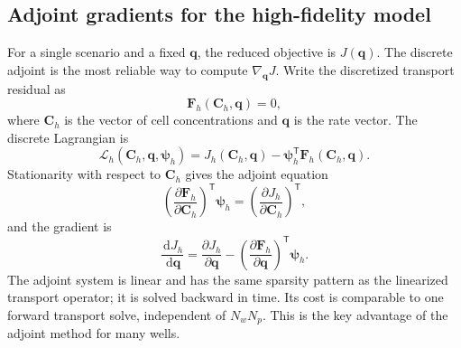 \documentclass[11pt]{article}
\numberwithin{equation}{section}
\newcommand{\dd}{\,\mathrm{d}}
\newcommand{\T}{\mathsf{T}}
\theoremstyle{plain}
\begin{document}
\subsection{Adjoint gradients for the high-fidelity model}
\label{sec:adjoint}

For a single scenario and a fixed $\mathbf{q}$, the reduced objective is
$J(\mathbf{q})$.  The discrete adjoint is the most reliable way to compute
$\nabla_{\mathbf{q}}J$.  Write the discretized transport residual as
\begin{equation}
\label{eq:discreteF}
\mathbf{F}_h(\mathbf{C}_h,\mathbf{q})=0,
\end{equation}
where $\mathbf{C}_h$ is the vector of cell concentrations and $\mathbf{q}$ is
the rate vector.  The discrete Lagrangian is
\begin{equation}
\label{eq:discreteL}
\mathcal{L}_h(\mathbf{C}_h,\mathbf{q},\bm{\psi}_h)
=J_h(\mathbf{C}_h,\mathbf{q})
-\bm{\psi}_h^{\T}\mathbf{F}_h(\mathbf{C}_h,\mathbf{q}).
\end{equation}
Stationarity with respect to $\mathbf{C}_h$ gives the adjoint equation
\begin{equation}
\label{eq:discreteadj}
\left(\frac{\partial\mathbf{F}_h}{\partial\mathbf{C}_h}\right)^{\T}
\bm{\psi}_h
=\left(\frac{\partial J_h}{\partial\mathbf{C}_h}\right)^{\T},
\end{equation}
and the gradient is
\begin{equation}
\label{eq:discretegrad}
\frac{\dd J_h}{\dd\mathbf{q}}
=\frac{\partial J_h}{\partial\mathbf{q}}
-\left(\frac{\partial\mathbf{F}_h}{\partial\mathbf{q}}\right)^{\T}
\bm{\psi}_h.
\end{equation}
The adjoint system is linear and has the same sparsity pattern as the
linearized transport operator; it is solved backward in time.  Its cost is
comparable to one forward transport solve, independent of $N_wN_p$.  This is
the key advantage of the adjoint method for many wells.
\end{document}
